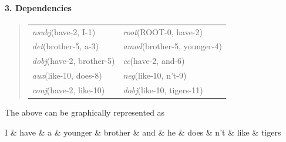 \documentclass[12pt]{ociamthesis}  %
\begin{document}
\paragraph*{3. Dependencies}
\begin{quote}
\centering 
\begin{tabular}{l l}
\emph{nsubj}(have-2, I-1) & \emph{root}(ROOT-0, have-2) \\
\emph{det}(brother-5, a-3) & \emph{amod}(brother-5, younger-4) \\
\emph{dobj}(have-2, brother-5) & \emph{cc}(have-2, and-6) \\
\emph{aux}(like-10, does-8) & \emph{neg}(like-10, n't-9) \\
\emph{conj}(have-2, like-10) & \emph{dobj}(like-10, tigers-11)
\end{tabular}
\end{quote}

The above can be graphically represented as
\par
\begin{changemargin}{0.8em}{0.8em}
\begin{dependency}
   \begin{deptext}[column sep=1.3em]
		I \& have \& a \& younger \& brother \& and \& he \& does \& n't \& like \& tigers
		\\
   \end{deptext}
    \\
    \\
    \\
    \\
    \\
    \\
    \\
    \\
\end{dependency}
\end{changemargin}
\end{document}
